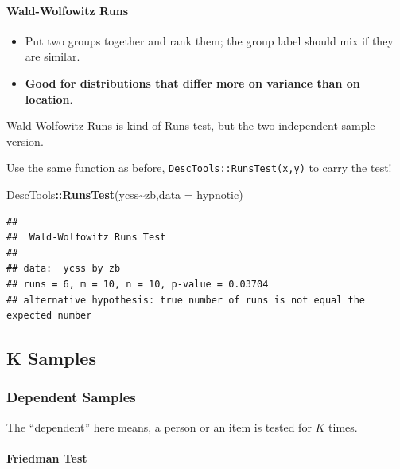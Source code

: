 \documentclass[
]{ctexart}
\newenvironment{Shaded}{\begin{snugshade}}{\end{snugshade}}
\newcommand{\AttributeTok}[1]{\textcolor[rgb]{0.13,0.29,0.53}{#1}}
\newcommand{\FunctionTok}[1]{\textcolor[rgb]{0.13,0.29,0.53}{\textbf{#1}}}
\newcommand{\NormalTok}[1]{#1}
\newcommand{\SpecialCharTok}[1]{\textcolor[rgb]{0.81,0.36,0.00}{\textbf{#1}}}
\providecommand{\tightlist}{%
  \setlength{\itemsep}{0pt}\setlength{\parskip}{0pt}}
\begin{document}
\hypertarget{wald-wolfowitz-runs}{%
\paragraph{Wald-Wolfowitz Runs}\label{wald-wolfowitz-runs}}

\begin{itemize}
\tightlist
\item
  Put two groups together and rank them; the group label should mix if
  they are similar.
\item
  \textbf{Good for distributions that differ more on variance than on
  location}.
\end{itemize}

Wald-Wolfowitz Runs is kind of Runs test, but the two-independent-sample
version.

Use the same function as before, \texttt{DescTools::RunsTest(x,y)} to
carry the test!

\begin{Shaded}
\begin{Highlighting}[]
\NormalTok{DescTools}\SpecialCharTok{::}\FunctionTok{RunsTest}\NormalTok{(ycss}\SpecialCharTok{\textasciitilde{}}\NormalTok{zb,}\AttributeTok{data =}\NormalTok{ hypnotic)}
\end{Highlighting}
\end{Shaded}

\begin{verbatim}
## 
##  Wald-Wolfowitz Runs Test
## 
## data:  ycss by zb
## runs = 6, m = 10, n = 10, p-value = 0.03704
## alternative hypothesis: true number of runs is not equal the expected number
\end{verbatim}

\hypertarget{k-samples}{%
\subsection{K Samples}\label{k-samples}}

\hypertarget{dependent-samples}{%
\subsubsection{Dependent Samples}\label{dependent-samples}}

The ``dependent'' here means, a person or an item is tested for \(K\)
times.

\hypertarget{friedman-test}{%
\paragraph{Friedman Test}\label{friedman-test}}
\end{document}
